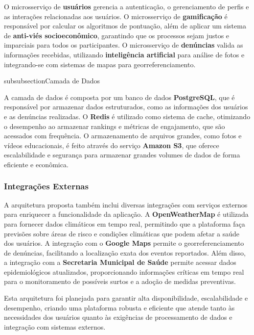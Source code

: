 \documentclass[a4paper, 12pt]{article}
\begin{document}
 O microsserviço de \textbf{usuários} gerencia a autenticação, o gerenciamento de perfis e as interações relacionadas aos usuários. O microsserviço de \textbf{gamificação} é responsável por calcular os algoritmos de pontuação, além de aplicar um sistema de \textbf{anti-viés socioeconômico}, garantindo que os processos sejam justos e imparciais para todos os participantes. O microsserviço de \textbf{denúncias} valida as informações recebidas, utilizando \textbf{inteligência artificial} para análise de fotos e integrando-se com sistemas de mapas para georreferenciamento.

subsubsection{Camada de Dados}

A camada de dados é composta por um banco de dados \textbf{PostgreSQL}, que é responsável por armazenar dados estruturados, como as informações dos usuários e as denúncias realizadas. O \textbf{Redis} é utilizado como sistema de cache, otimizando o desempenho ao armazenar rankings e métricas de engajamento, que são acessados com frequência. O armazenamento de arquivos grandes, como fotos e vídeos educacionais, é feito através do serviço \textbf{Amazon S3}, que oferece escalabilidade e segurança para armazenar grandes volumes de dados de forma eficiente e econômica.

\subsubsection{Integrações Externas}

A arquitetura proposta também inclui diversas integrações com serviços externos para enriquecer a funcionalidade da aplicação. A \textbf{OpenWeatherMap} é utilizada para fornecer dados climáticos em tempo real, permitindo que a plataforma faça previsões sobre áreas de risco e condições climáticas que podem afetar a saúde dos usuários. A integração com o \textbf{Google Maps} permite o georreferenciamento de denúncias, facilitando a localização exata dos eventos reportados. Além disso, a integração com a \textbf{Secretaria Municipal de Saúde} permite acessar dados epidemiológicos atualizados, proporcionando informações críticas em tempo real para o monitoramento de possíveis surtos e a adoção de medidas preventivas.

Esta arquitetura foi planejada para garantir alta disponibilidade, escalabilidade e desempenho, criando uma plataforma robusta e eficiente que atende tanto às necessidades dos usuários quanto às exigências de processamento de dados e integração com sistemas externos.
\end{document}
